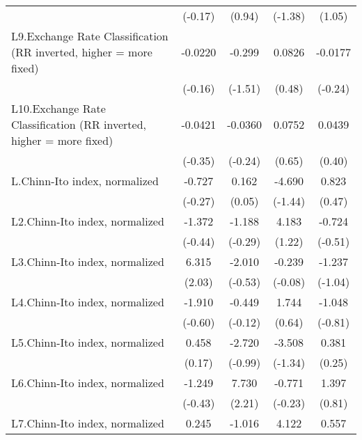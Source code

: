 {\begin{longtable}{l*{4}{c}}
                &  (-0.17)         &   (0.94)         &  (-1.38)         &   (1.05)         \\
[1em]
L9.Exchange Rate Classification (RR inverted, higher = more fixed)&  -0.0220         &   -0.299         &   0.0826         &  -0.0177         \\
                &  (-0.16)         &  (-1.51)         &   (0.48)         &  (-0.24)         \\
[1em]
L10.Exchange Rate Classification (RR inverted, higher = more fixed)&  -0.0421         &  -0.0360         &   0.0752         &   0.0439         \\
                &  (-0.35)         &  (-0.24)         &   (0.65)         &   (0.40)         \\
[1em]
L.Chinn-Ito index, normalized&   -0.727         &    0.162         &   -4.690         &    0.823         \\
                &  (-0.27)         &   (0.05)         &  (-1.44)         &   (0.47)         \\
[1em]
L2.Chinn-Ito index, normalized&   -1.372         &   -1.188         &    4.183         &   -0.724         \\
                &  (-0.44)         &  (-0.29)         &   (1.22)         &  (-0.51)         \\
[1em]
L3.Chinn-Ito index, normalized&    6.315\sym{*}  &   -2.010         &   -0.239         &   -1.237         \\
                &   (2.03)         &  (-0.53)         &  (-0.08)         &  (-1.04)         \\
[1em]
L4.Chinn-Ito index, normalized&   -1.910         &   -0.449         &    1.744         &   -1.048         \\
                &  (-0.60)         &  (-0.12)         &   (0.64)         &  (-0.81)         \\
[1em]
L5.Chinn-Ito index, normalized&    0.458         &   -2.720         &   -3.508         &    0.381         \\
                &   (0.17)         &  (-0.99)         &  (-1.34)         &   (0.25)         \\
[1em]
L6.Chinn-Ito index, normalized&   -1.249         &    7.730\sym{*}  &   -0.771         &    1.397         \\
                &  (-0.43)         &   (2.21)         &  (-0.23)         &   (0.81)         \\
[1em]
L7.Chinn-Ito index, normalized&    0.245         &   -1.016         &    4.122         &    0.557         \\

\end{longtable}}
